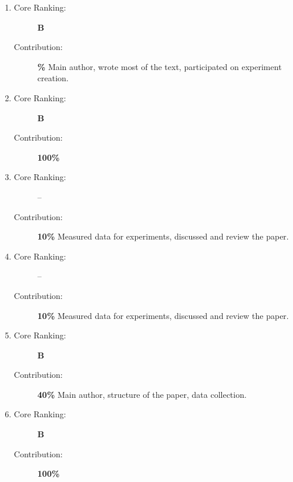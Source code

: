 \begin{enumerate}
  \item {} 
  \begin{description}
    \item[Core Ranking:] \textbf{B}
    \item[Contribution:] \textbf{\%} Main author, wrote most of the text, participated on experiment creation. %
  \end{description}

  \item {} 
  \begin{description}
    \item[Core Ranking:] \textbf{B}
    \item[Contribution:] \textbf{100\%}
  \end{description}

  \item {} 
  \begin{description}
    \item[Core Ranking:] --
    \item[Contribution:] \textbf{10\%} Measured data for experiments, discussed and review the paper.
  \end{description}
  
  \item {}
  \begin{description}
    \item[Core Ranking:] --
    \item[Contribution:] \textbf{10\%} Measured data for experiments, discussed and review the paper.
  \end{description}
  
  \item {}
  \begin{description}
    \item[Core Ranking:] \textbf{B}
    \item[Contribution:] \textbf{40\%} Main author, structure of the paper, data collection.
  \end{description}
  
  \item {}
  \begin{description}
    \item[Core Ranking:] \textbf{B}
    \item[Contribution:] \textbf{100\%}
  \end{description}  
  

\end{enumerate}
